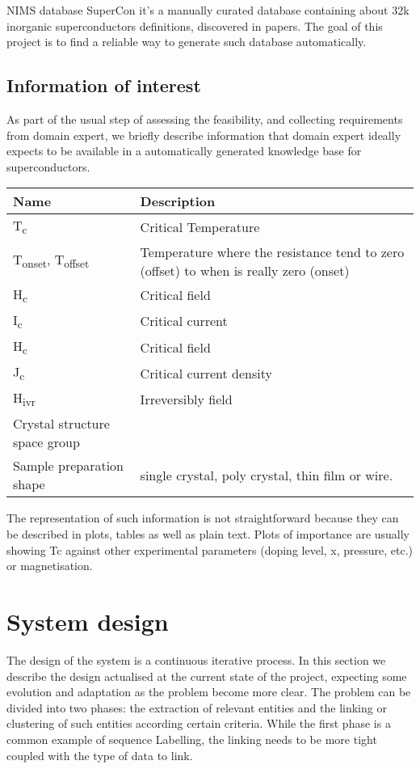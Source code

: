 \documentclass{article}
\begin{document}
NIMS database SuperCon\cite{SuperCon} it's a manually curated database containing about 32k inorganic superconductors definitions, discovered in papers. 
The goal of this project is to find a reliable way to generate such database automatically. 

\subsection{Information of interest}
As part of the usual step of assessing the feasibility, and collecting requirements from domain expert, we briefly describe information that domain expert ideally expects to be available in a automatically generated knowledge base for superconductors. 

\begin{center}
    \begin{tabular}{ | m{5em} | m{8cm}| } 
    \hline
        Name & Description  \\ [0.5ex] 
    \hline\hline
        T\textsubscript{c} & Critical Temperature\\ 
    \hline
        T\textsubscript{onset}, T\textsubscript{offset} & Temperature where the resistance tend to zero (offset) to when is really zero (onset)\\ 
    \hline
        H\textsubscript{c} & Critical field\\ 
    \hline
        I\textsubscript{c} & Critical current\\
    \hline
        H\textsubscript{c} & Critical field\\ 
    \hline
        J\textsubscript{c} & Critical current density\\ 
    \hline
        H\textsubscript{ivr} & Irreversibly field\\
    \hline
        Crystal structure space group & \\
    \hline
        Sample preparation shape & single crystal, poly crystal, thin film or wire. \\
    \hline    
    \end{tabular}
\end{center}

The representation of such information is not straightforward because they can be described in plots, tables as well as plain text. Plots of importance are usually showing Tc against other experimental parameters (doping level, x, pressure, etc.) or magnetisation. 

\section{System design}
The design of the system is a continuous iterative process. In this section we describe the design actualised at the current state of the project, expecting some evolution and adaptation as the problem become more clear. 
The problem can be divided into two phases: the extraction of relevant entities and the linking or clustering of such entities according certain criteria. 
While the first phase is a common example of sequence Labelling, the linking needs to be more tight coupled with the type of data to link. 
\end{document}
